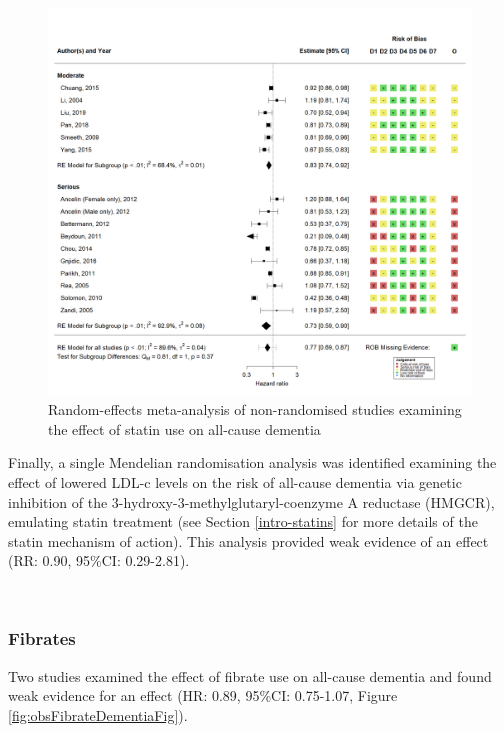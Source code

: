 \documentclass[a4paper, twoside]{templates/ociamthesis}
\begin{document}
\begin{figure}[H]
\includegraphics[width=1\linewidth]{figures/sys-rev/fp_obs_Statin-Ever_Dementia} \caption[Random-effects meta-analysis of statins on all-cause dementia]{Random-effects meta-analysis of non-randomised studies examining the effect of statin use on all-cause dementia}\label{fig:obsStatinDementiaFig}
\end{figure}

Finally, a single Mendelian randomisation analysis was identified examining the effect of lowered LDL-c levels on the risk of all-cause dementia via genetic inhibition of the 3-hydroxy-3-methylglutaryl-coenzyme A reductase (HMGCR), emulating statin treatment (see Section \ref{intro-statins} for more details of the statin mechanism of action). This analysis provided weak evidence of an effect (RR: 0.90, 95\%CI: 0.29-2.81).

~

\hypertarget{fibrates}{%
\subsubsection{Fibrates}\label{fibrates}}

Two studies examined the effect of fibrate use on all-cause dementia and found weak evidence for an effect (HR: 0.89, 95\%CI: 0.75-1.07, Figure \ref{fig:obsFibrateDementiaFig}).
\end{document}
